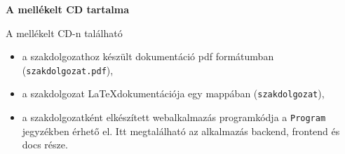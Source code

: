 \label{Chap:CD}
\pagestyle{empty}

\noindent \textbf{\Large A mellékelt CD tartalma}

\vskip 1cm

A mellékelt CD-n található

\begin{itemize}
\item a szakdolgozathoz készült dokumentáció pdf formátumban (\texttt{szakdolgozat.pdf}), 
\item a szakdolgozat \LaTeX dokumentációja egy mappában (\texttt{szakdolgozat}),
\item a szakdolgozatként elkészített webalkalmazás programkódja a \texttt{Program} jegyzékben érhető el. Itt megtalálható az alkalmazás backend, frontend és docs része.
\end{itemize}